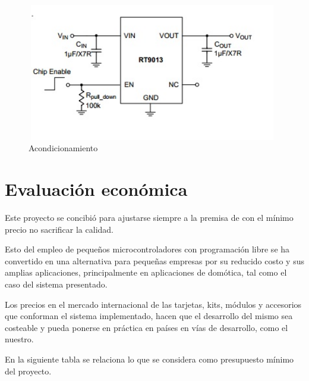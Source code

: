 \begin{figure}[H]
    \centering
    \includegraphics[width=11cm, height=6cm]{imagenes/acondicionamiento RT9013.jpg}
    \caption{Acondicionamiento}
    \label{imag:acondicionamiento_RT9013}
\end{figure}

\section{Evaluación económica}

Este proyecto se concibió para ajustarse siempre a la premisa de con el mínimo precio no sacrificar la calidad.

Esto del empleo de pequeños microcontroladores con programación libre se ha convertido en una alternativa para pequeñas empresas por su reducido costo y sus amplias aplicaciones, principalmente en aplicaciones de domótica, tal como el caso del sistema presentado.

Los precios en el mercado internacional de las tarjetas, kits, módulos y accesorios que conforman el sistema implementado, hacen que el desarrollo del mismo sea costeable y pueda ponerse en práctica en países en vías de desarrollo, como el nuestro.

En la siguiente tabla se relaciona lo que se considera como presupuesto mínimo del proyecto.

